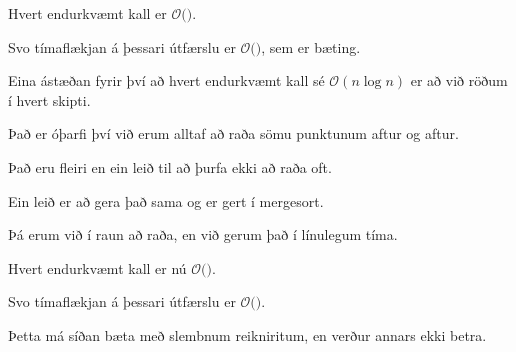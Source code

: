 {
}

{
	{
		\item<1-> Hvert endurkvæmt kall er $\mathcal{O}($\onslide<2->{$n \log n$}$)$.
		\item<3-> Svo tímaflækjan á þessari útfærslu er $\mathcal{O}($$)$, sem er bæting.
		\item<5-> Eina ástæðan fyrir því að hvert endurkvæmt kall sé $\mathcal{O}(n \log n)$ er að við röðum í hvert skipti.
		\item<6-> Það er óþarfi því við erum alltaf að raða sömu punktunum aftur og aftur.
		\item<7-> Það eru fleiri en ein leið til að þurfa ekki að raða oft.
		\item<8-> Ein leið er að gera það sama og er gert í mergesort.
		\item<9-> Þá erum við í raun að raða, en við gerum það í línulegum tíma.
	}
}

{
}

{
	{
		\item<1-> Hvert endurkvæmt kall er nú $\mathcal{O}($\onslide<2->{$\,n\,$}$)$.
		\item<3-> Svo tímaflækjan á þessari útfærslu er $\mathcal{O}($\onslide<4->{$n \log n$}$)$.
		\item<5-> Þetta má síðan bæta með slembnum reikniritum, en verður annars ekki betra.
	}
}

{
}


